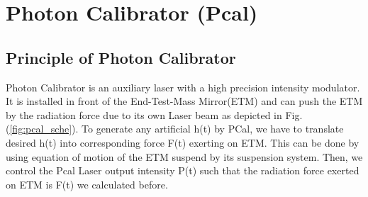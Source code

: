%
%
%
%
%
%


\section{Photon Calibrator (Pcal)}
\subsection{Principle of Photon Calibrator}
\label{sec:pcalth}
Photon Calibrator is an auxiliary laser with a high precision intensity modulator. It is installed in front of the End-Test-Mass Mirror(ETM) and can push the ETM by the radiation force due to its own Laser beam as depicted in Fig.(\ref{fig:pcal_sche}). To generate any artificial h(t) by PCal, we have to translate desired h(t) into corresponding force F(t) exerting on ETM. This can be done by using equation of motion of the ETM suspend by its suspension system. Then, we control the Pcal Laser output intensity P(t) such that the radiation force exerted on ETM is F(t) we calculated before. 

